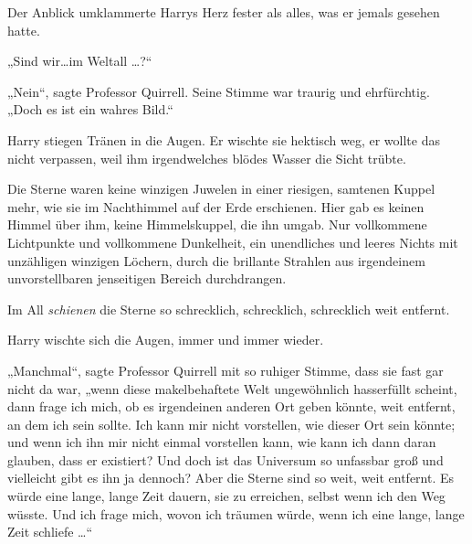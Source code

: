 Der Anblick umklammerte Harrys Herz fester als alles, was er jemals gesehen hatte.

„Sind wir…im Weltall …?“

„Nein“, sagte Professor Quirrell. Seine Stimme war traurig und ehrfürchtig. „Doch es ist ein wahres Bild.“

Harry stiegen Tränen in die Augen. Er wischte sie hektisch weg, er wollte das nicht verpassen, weil ihm irgendwelches blödes Wasser die Sicht trübte.

Die Sterne waren keine winzigen Juwelen in einer riesigen, samtenen Kuppel mehr, wie sie im Nachthimmel auf der Erde erschienen. Hier gab es keinen Himmel über ihm, keine Himmelskuppel, die ihn umgab. Nur vollkommene Lichtpunkte und vollkommene Dunkelheit, ein unendliches und leeres Nichts mit unzähligen winzigen Löchern, durch die brillante Strahlen aus irgendeinem unvorstellbaren jenseitigen Bereich durchdrangen.

Im All \emph{schienen} die Sterne so schrecklich, schrecklich, schrecklich weit entfernt.

Harry wischte sich die Augen, immer und immer wieder.

„Manchmal“, sagte Professor Quirrell mit so ruhiger Stimme, dass sie fast gar nicht da war, „wenn diese makelbehaftete Welt ungewöhnlich hasserfüllt scheint, dann frage ich mich, ob es irgendeinen anderen Ort geben könnte, weit entfernt, an dem ich sein sollte. Ich kann mir nicht vorstellen, wie dieser Ort sein könnte; und wenn ich ihn mir nicht einmal vorstellen kann, wie kann ich dann daran glauben, dass er existiert? Und doch ist das Universum so unfassbar groß und vielleicht gibt es ihn ja dennoch? Aber die Sterne sind so weit, weit entfernt. Es würde eine lange, lange Zeit dauern, sie zu erreichen, selbst wenn ich den Weg wüsste. Und ich frage mich, wovon ich träumen würde, wenn ich eine lange, lange Zeit schliefe …“

